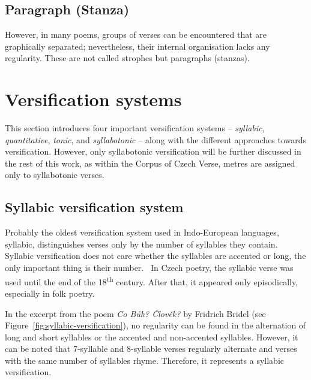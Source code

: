 \subsection{Paragraph (Stanza)}
However, in many poems, groups of verses can be encountered that are graphically separated; nevertheless, their internal organisation lacks any regularity. These are not called strophes but paragraphs (stanzas).~\cite{TeorieLiteraturySS}

\section{Versification systems}
This section introduces four important versification systems -- \emph{syllabic}, \emph{quantitative}, \emph{tonic}, and \emph{syllabotonic} -- along with the different approaches towards versification. However, only syllabotonic versification will be further discussed in the rest of this work, as within the Corpus of Czech Verse, metres are assigned only to syllabotonic verses.~\cite{CorpusCzechVerse}

\subsection{Syllabic versification system}
Probably the oldest versification system used in Indo-European languages, syllabic, distinguishes verses only by the number of syllables they contain. Syllabic versification does not care whether the syllables are accented or long, the only important thing is their number.~\cite{UvodTeorieVerse} In Czech poetry, the syllabic verse was used until the end of the 18\textsuperscript{th} century. After that, it appeared only episodically, especially in folk poetry.~\cite{TeorieLiteraturySS}

In the excerpt from the poem \emph{Co Bůh? Člověk?} by Fridrich Bridel (see Figure~\ref{fig:syllabic-versification}), no regularity can be found in the alternation of long and short syllables or the accented and non-accented syllables. However, it can be noted that 7-syllable and 8-syllable verses regularly alternate and verses with the same number of syllables rhyme. Therefore, it represents a syllabic versification.~\cite{TeorieLiteraturySS}

